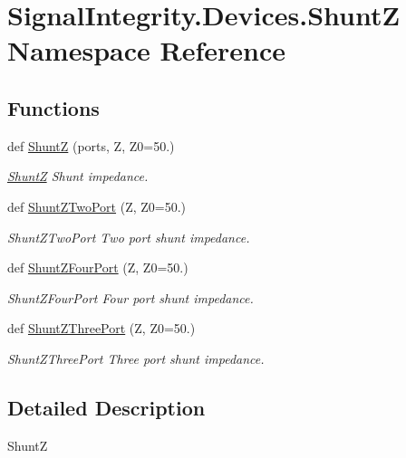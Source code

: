 \hypertarget{namespaceSignalIntegrity_1_1Devices_1_1ShuntZ}{}\section{Signal\+Integrity.\+Devices.\+ShuntZ Namespace Reference}
\label{namespaceSignalIntegrity_1_1Devices_1_1ShuntZ}
\subsection*{Functions}
\begin{DoxyCompactItemize}
\item 
def \hyperlink{namespaceSignalIntegrity_1_1Devices_1_1ShuntZ_a6715a0f359c1c81ef3ffdeaa211a562d}{ShuntZ} (ports, Z, Z0=50.)
\begin{DoxyCompactList}\small\item\em \hyperlink{namespaceSignalIntegrity_1_1Devices_1_1ShuntZ}{ShuntZ} Shunt impedance. \end{DoxyCompactList}\item 
def \hyperlink{namespaceSignalIntegrity_1_1Devices_1_1ShuntZ_a632e682133ebf3a6d617516e754f9125}{Shunt\+Z\+Two\+Port} (Z, Z0=50.)
\begin{DoxyCompactList}\small\item\em Shunt\+Z\+Two\+Port Two port shunt impedance. \end{DoxyCompactList}\item 
def \hyperlink{namespaceSignalIntegrity_1_1Devices_1_1ShuntZ_a071383dcde5ba797b9f5882b739c77ee}{Shunt\+Z\+Four\+Port} (Z, Z0=50.)
\begin{DoxyCompactList}\small\item\em Shunt\+Z\+Four\+Port Four port shunt impedance. \end{DoxyCompactList}\item 
def \hyperlink{namespaceSignalIntegrity_1_1Devices_1_1ShuntZ_a4f6b7665037fa8b00407684e513e7e37}{Shunt\+Z\+Three\+Port} (Z, Z0=50.)
\begin{DoxyCompactList}\small\item\em Shunt\+Z\+Three\+Port Three port shunt impedance. \end{DoxyCompactList}\end{DoxyCompactItemize}


\subsection{Detailed Description}
\begin{DoxyVerb}ShuntZ\end{DoxyVerb}
 

